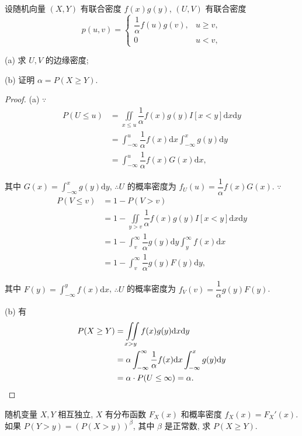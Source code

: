 \documentclass[color=black,device=normal,lang=cn]{elegantnote}
\numberwithin{equation}{section}
\theoremstyle{plain}
\numberwithin{exercise}{exsection}
\begin{document}
\begin{exercise}%
    设随机向量 $(X,Y)$ 有联合密度 $f(x)g(y)$, $(U,V)$ 有联合密度
    \[p(u,v)=\begin{cases}
        \dfrac{1}{\alpha}f(u)g(v), & u\geq v, \\[6pt]
        0 & u<v,
    \end{cases}\]

    (a) 求 $U,V$ 的边缘密度;

    (b) 证明 $\alpha=P(X\geq Y)$.
\end{exercise}
\begin{proof}
    (a) $\because$
    \begin{align*}
        P(U\leq u) & =\iint\limits_{x\leq u}\dfrac{1}{\alpha}f(x)g(y)I[x<y]\mathrm{d}x\mathrm{d}y \\
        & =\int_{-\infty}^u\dfrac{1}{\alpha}f(x)\mathrm{d}x\int_{-\infty}^xg(y)\mathrm{d}y \\
        & =\int_{-\infty}^u\dfrac{1}{\alpha}f(x)G(x)\mathrm{d}x,
    \end{align*}

    其中 $G(x)=\int_{-\infty}^xg(y)\mathrm{d}y$, $\therefore U$ 的概率密度为 $f_U(u)=\dfrac{1}{\alpha}f(x)G(x)$. $\because$
    \begin{align*}
        P(V\leq v) & =1-P(V>v) \\
        & =1-\iint\limits_{y>v}\dfrac{1}{\alpha}f(x)g(y)I[x<y]\mathrm{d}x\mathrm{d}y \\
        & =1-\int_v^\infty\dfrac{1}{\alpha}g(y)\mathrm{d}y\int_y^\infty f(x)\mathrm{d}x \\
        & =1-\int_v^\infty\dfrac{1}{\alpha}g(y)F(y)\mathrm{d}y,
    \end{align*}

    其中 $F(y)=\int_{-\infty}^yf(x)\mathrm{d}x$, $\therefore U$ 的概率密度为 $f_V(v)=\dfrac{1}{\alpha}g(y)F(y)$.

    (b) 有
    \begin{align*}
        P(X\geq Y) & =\iint\limits_{x>y}f(x)g(y)\mathrm{d}x\mathrm{d}y \\
        & =\alpha\int_{-\infty}^\infty\dfrac{1}{\alpha}f(x)\mathrm{d}x\int_{-\infty}^xg(y)\mathrm{d}y \\
        & =\alpha\cdot P(U\leq\infty)=\alpha.\qedhere
    \end{align*}
\end{proof}
\begin{exercise}%
    随机变量 $X,Y$ 相互独立, $X$ 有分布函数 $F_X(x)$ 和概率密度 $f_X(x)=F_X'(x)$. 如果 $P(Y>y)=(P(X>y))^\beta$, 其中 $\beta$ 是正常数, 求 $P(X\geq Y)$.
\end{exercise}
\end{document}
